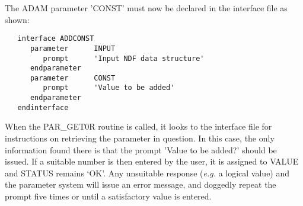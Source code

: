 The ADAM parameter 'CONST' must now be declared in the interface file as 
shown:
\begin{verbatim}
   interface ADDCONST
      parameter      INPUT         
         prompt      'Input NDF data structure'
      endparameter
      parameter      CONST          
         prompt      'Value to be added'
      endparameter
   endinterface
\end{verbatim}
When the PAR\_GET0R routine is called, it looks to the interface file
for instructions on retrieving the parameter in question.
In this case, the only information found there is that the
prompt 'Value to be added?' should be issued.
If a suitable number is then entered by the user, it is assigned to VALUE
and STATUS remains `OK'.
Any unsuitable response ({\it e.g.} a logical value) and the parameter 
system will
issue an error message, and doggedly repeat the prompt five times or until
a satisfactory value is entered.


